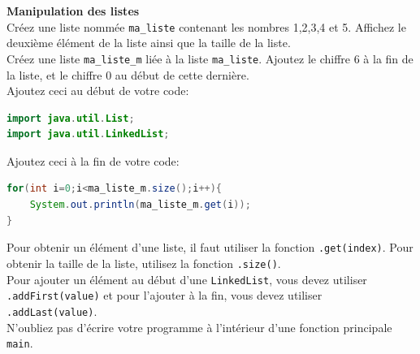 	\begin{Exercice}[10 minutes] [Java] \textbf{Manipulation des listes}\\
      	Créez une liste nommée \lstinline{ma_liste} contenant les nombres 1,2,3,4 et 5. Affichez le deuxième élément de la liste ainsi que la taille de la liste. \\
      	
      	Créez une liste \lstinline{ma_liste_m} liée à la liste \lstinline{ma_liste}. Ajoutez le chiffre 6 à la fin de la liste, et le chiffre 0 au début de cette dernière. \\
      	
      	Ajoutez ceci au début de votre code:
      	\begin{lstlisting}[language=Java]
import java.util.List;
import java.util.LinkedList; \end{lstlisting}
	     
	     Ajoutez ceci à la fin de votre code:
	     
	    \begin{lstlisting}[language=Java]
for(int i=0;i<ma_liste_m.size();i++){
    System.out.println(ma_liste_m.get(i));
} \end{lstlisting} 
    
        \begin{conseil}
            Pour obtenir un élément d'une liste, il faut utiliser la fonction \lstinline{.get(index)}. Pour obtenir la taille de la liste, utilisez la fonction \lstinline{.size()}. \\
            
            Pour ajouter un élément au début d'une \lstinline{LinkedList}, vous devez utiliser \lstinline{.addFirst(value)} et pour l'ajouter à la fin, vous devez utiliser \lstinline{.addLast(value)}. \\
            
           	N'oubliez pas d'écrire votre programme à l'intérieur d'une fonction principale \lstinline{main}. \\
           	
           	
		     
        \end{conseil}
        
        \begin{solution}
            
        \end{solution}
    \end{Exercice}
    
